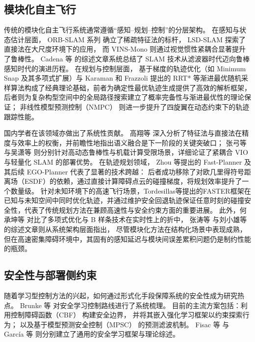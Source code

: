 \subsection{模块化自主飞行}

传统的模块化自主飞行系统通常遵循“感知--规划--控制”的分层架构。
在感知与状态估计层面，
ORB-SLAM 系列\cite{MurArtal2017ORBSLAM2,Campos2021ORBSLAM3} 确立了稀疏特征法的标杆，
LSD-SLAM\cite{Engel2014LSDSLAM} 探索了直接法在大尺度环境下的应用，
而 VINS-Mono\cite{Qin2018VINSMONO} 则通过视觉惯性紧耦合显著提升了鲁棒性。
Cadena 等\cite{Cadena2016SLAMSurvey} 的综述文章系统总结了 SLAM 技术从滤波器时代迈向鲁棒感知时代的演进历程。
在规划与控制层面，
基于梯度的轨迹优化（如 Minimum Snap\cite{Mellinger2011MinSnapTrajectory} 及其多项式扩展\cite{Richter2016MinSnapPoly}）与 Karaman 和 Frazzoli\cite{Karaman2011SamplingOptimal} 提出的 RRT* 等渐进最优随机采样算法构成了经典理论基础，前者为确定性最优轨迹生成提供了高效的解析框架，后者则为复杂构型空间中的全局路径搜索建立了概率完备性与渐进最优性的理论保证；
非线性模型预测控制（NMPC）\cite{Kamel2017NMPC,Neunert2016MPC_Quadrotor} 则进一步提升了四旋翼在动态约束下的轨迹跟踪性能。

国内学者在该领域亦做出了系统性贡献。
高翔等\cite{Gao2019SLAMSurvey} 深入分析了特征法与直接法在精度与效率上的权衡，并前瞻性地指出语义融合是下一阶段的关键突破口；
张弓等\cite{Zhang2018VIOSLAM} 与吴潇等\cite{Wu2022QuadSLAM} 则分别针对高动态鲁棒性与机载计算受限场景，详细论证了紧耦合 VIO 与轻量化 SLAM 的部署优势。
在轨迹规划领域，
Zhou 等提出的 Fast-Planner\cite{Zhou2019FastPlanner} 及其后续 EGO-Planner\cite{Zhou2021EGOPlanner} 代表了显著的技术跨越：
后者成功移除了对欧几里得符号距离场（ESDF）的依赖，通过直接计算障碍点云的碰撞梯度，将规划效率提升了一个数量级。
针对未知环境下的高速飞行场景，Tordesillas等\cite{Faust2018FASTER}提出的FASTER框架在已知与未知空间中同时优化轨迹，并通过维护安全回退轨迹保证任意时刻的碰撞安全性，代表了传统规划方法在兼顾高速性与安全约束方面的重要进展。
此外，何承坤等\cite{He2021QuadTrajectory} 对比了多项式优化与 B 样条技术在实时性上的折中，
张涛等\cite{Zhang2020AutoPilotSurvey} 与刘小雄等\cite{Liu2020QuadControl} 的综述文章则从系统架构层面指出，
尽管模块化方法在结构化场景中表现成熟，
但在高速密集障碍环境中，其固有的感知延迟与模块间误差累积问题仍是制约性能的瓶颈。

\subsection{安全性与部署侧约束}

随着学习型控制方法的兴起，如何通过形式化手段保障系统的安全性成为研究热点。
Brunke 等\cite{Brunke2022SafeLearningReview} 对安全学习控制路线进行了系统梳理。
目前的主流方案包括：利用控制障碍函数（CBF）\cite{Ames2019CBFSurvey} 构建安全边界，
并将其嵌入强化学习框架以约束探索行为\cite{Cheng2019RLwithCBF}；
以及基于模型预测安全控制（MPSC）\cite{Wabersich2018MPSC} 的预测滤波机制。
Fisac 等\cite{Fisac2019SafeRL} 与 Garc\'{i}a 等\cite{GarciaPineda2015SafeRLSurvey} 则分别建立了通用的安全学习框架与理论综述。

